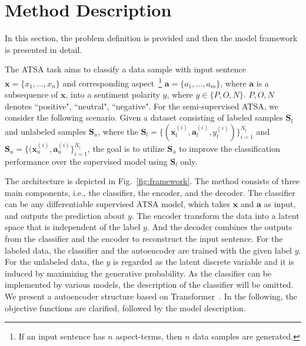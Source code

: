 \documentclass[11pt,a4paper]{article}
\begin{document}
\section{Method Description}
\label{sec:model}
In this section, the problem definition is provided and then the model framework is presented in detail.

The ATSA task aims to classify a data sample with input sentence $\mathbf{x}=\{x_1, ..., x_n\}$ and corresponding aspect~\footnote{If an input sentence has $n$ aspect-terms, then $n$ data samples are generated.} $\mathbf{a}=\{a_1, ..., a_m\}$, where $\textbf{a}$ is a subsequence of $\textbf{x}$, into a sentiment polarity $y$, where $y \in \{P, O, N\}$.
$P, O, N$ denotes ``positive", ``neutral", ``negative".
For the semi-supervised ATSA, we consider the following scenario.
Given a dataset consisting of labeled samples $\mathbf{S}_l$ and unlabeled samples $\textbf{S}_u$, where the  $\mathbf{S}_l=\{(\mathbf{x}_l^{(i)},\mathbf{a}_l^{(i)}, y_l^{(i)})\}^{N_l}_{i=1}$ and $\mathbf{S}_u=\{(\mathbf{x}_u^{(i)},\mathbf{a}_u^{(i)}\}^{N_l}_{i=1}$, the goal is to utilize $\mathbf{S}_u$ to improve the classification performance over the supervised model using $\mathbf{S}_l$ only.

The architecture is depicted in Fig.~\ref{fig:framework}.
The method consists of three main components, i.e., the classifier, the encoder, and the decoder.	
The classifier can be any differentiable supervised ATSA model, which takes $\mathbf{x}$ and $\mathbf{a}$ as input, and outputs the prediction about $y$.
The encoder transform the data into a latent space that is independent of the label $y$.
And the decoder combines the outputs from the classifier and the encoder to reconstruct the input sentence.
For the labeled data, the classifier and the autoencoder are trained with the given label $y$.
For the unlabeled data, the $y$ is regarded as the latent discrete variable and it is induced by maximizing the generative probability.
As the classifier can be implemented by various models, the description of the classifier will be omitted.
We present a autoencoder structure based on Transformer~\cite{DBLP:conf/nips/VaswaniSPUJGKP17}. In the following, the objective functions are clarified, followed by the model description.
\end{document}
